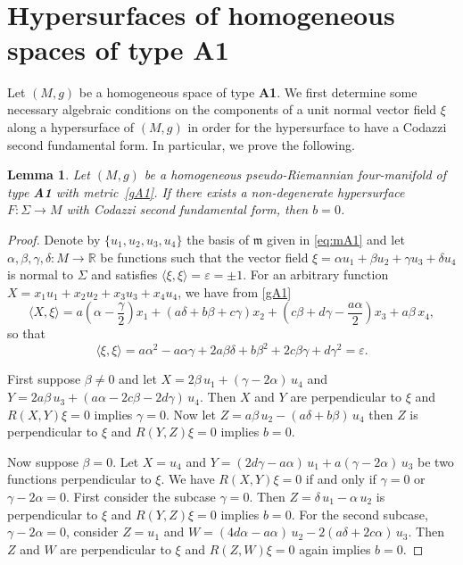 \documentclass{amsart}
\theoremstyle{plain}
\newtheorem{lemma}{Lemma}
\theoremstyle{remark}
\def\R{\mathbb{R}}
\newcommand\m{{\mathfrak{m}}}
\begin{document}
{{\begin{equation}
\begin{array}{ll}
\end{array}
\end{equation}
}



\section{Hypersurfaces of homogeneous spaces of type \textbf{A1}}
\setcounter{equation}{0}

Let $(M,g)$ be a homogeneous space of type \textbf{A1}. We first determine some necessary algebraic conditions on the components of a unit normal vector field $\xi$ along a hypersurface of $(M,g)$ in order for the hypersurface to have a Codazzi second fundamental form. In particular, we prove the following.

\begin{lemma} \label{necA1}
Let $(M,g)$ be a homogeneous pseudo-Riemannian four-manifold of type {\rm\bf A1} with metric~\eqref{gA1}. If there exists a non-degenerate hypersurface $F : \Sigma \to M$ with Codazzi second fundamental form, then $b=0$.
\end{lemma}

\begin{proof}
Denote by $\{u_1,u_2,u_3,u_4\}$ the basis of $\m$ given in \eqref{eq:mA1} and let $\alpha, \beta, \gamma, \delta: M \to \R$ be functions such that the vector field $\xi=\alpha u_1+\beta u_2+\gamma u_3+\delta u_4$ is normal to $\Sigma$ and satisfies $\langle \xi,\xi \rangle =\varepsilon=\pm 1$. For an arbitrary function $X = x_1u_1+x_2u_2+x_3u_3+x_4u_4$, we have from \eqref{gA1}
\[
\langle X, \xi\rangle = a\left(\alpha - \frac{\gamma}{2} \right) x_1+  \left( a\delta+b\beta+c\gamma \right) x_2+ \left( c\beta+d\gamma-\frac{a\alpha}{2} \right) x_3 + a\beta\,x_4,
\]
so that
\[
\langle \xi, \xi\rangle  = a\alpha^2-a \alpha\gamma+2a\beta\delta+b\beta^2+2c\beta\gamma+d\gamma^2 = \varepsilon.
\]

First suppose $\beta \neq 0$ and let $X = 2\beta\, u_1 + (\gamma-2\alpha)\,u_4$ and $Y= 2a\beta\, u_3 + (a\alpha - 2c\beta -2d\gamma)\, u_4$. Then $X$ and $Y$ are perpendicular to $\xi$ and $R(X,Y)\xi = 0$ implies $\gamma = 0$. Now let $Z=a\beta\,u_2 - (a\delta+b\beta)\, u_4$ then $Z$ is perpendicular to $\xi$ and $R(Y,Z)\xi =0$ implies $b=0$.

Now suppose $\beta  =0 $. Let $X= u_4$ and $Y=(2d\gamma-a\alpha)\, u_1 + a(\gamma-2\alpha)\, u_3$ be two functions perpendicular to $\xi$. We have $R(X,Y)\xi = 0$ if and only if $\gamma = 0$ or $\gamma-2\alpha  = 0$. First consider the subcase  $\gamma = 0$. Then $Z= \delta\,u_1 - \alpha\,u_2$ is perpendicular to $\xi$ and $R(Y,Z)\xi = 0$ implies $b=0$. For the second subcase, $\gamma-2\alpha=0$, consider $Z = u_1$ and $W=\left(4d\alpha - a\alpha\right)\,u_2 - 2(a\delta +2c\alpha)\, u_3$. Then $Z$ and $W$ are perpendicular to $\xi$ and $R(Z,W)\xi = 0$ again implies $b=0$.
\end{proof}

}
\end{document}
